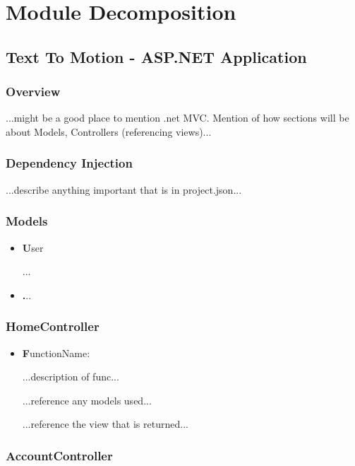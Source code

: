 \documentclass{scrreprt}
\begin{document}
\chapter{Module Decomposition}

\section{Text To Motion - ASP.NET Application}


\subsection{Overview}

...might be a good place to mention .net MVC. Mention of how sections will be about Models, Controllers (referencing views)...

\subsection{Dependency Injection}

...describe anything important that is in project.json...

\subsection{Models}

    \begin{itemize}
        \item \textbf User

        ...

        \item \textbf ...
    \end{itemize}


\subsection{HomeController}

    \begin{itemize}
        \item \textbf FunctionName:

        ...description of func...

        ...reference any models used...

        ...reference the view that is returned...
    \end{itemize}

\subsection{AccountController}
\end{document}
